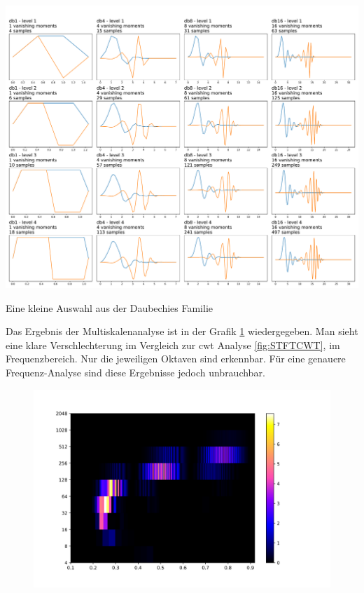 \begin{table}[!ht]
	\includegraphics[width=\linewidth]{papers/autotune/sections/frequenzanalyse/images/DaubechiesFamilie.pdf}
	\caption{Eine kleine Auswahl aus der Daubechies Familie}
	\label{tab:Daubechies}
\end{table}

Das Ergebnis der Multiskalenanalyse ist in der Grafik \ref{fig:sin-sweep} wiedergegeben. Man sieht eine klare Verschlechterung im Vergleich zur cwt Analyse  \ref{fig:STFTCWT}, im Frequenzbereich. Nur die jeweiligen Oktaven sind erkennbar. Für eine genauere Frequenz-Analyse sind diese Ergebnisse jedoch unbrauchbar.  


\begin{figure}[!ht]
	\centering
	\includegraphics[width=\linewidth]{papers/autotune/sections/frequenzanalyse/images/sweepdwt.jpg}
	\label{fig:sin-sweep}
\end{figure}%




